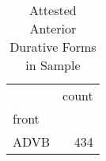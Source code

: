 \begin{table}[htbp!]
\centering
\caption{Attested Anterior Durative Forms in Sample}
\label{table:antdur_phtype}
\begin{tabular}{lr}
\toprule
{} &  count \\
front &        \\
\midrule
ADVB  &    434 \\
\bottomrule
\end{tabular}
\end{table}
